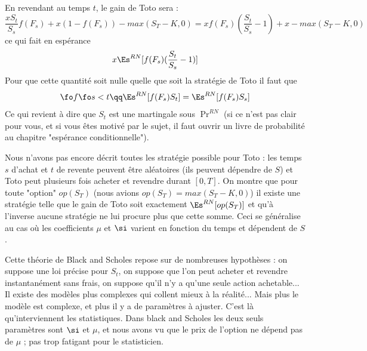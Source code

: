 \documentclass{article}
\begin{document}
 En  revendant au temps $t$, le gain de Toto sera :
$$
\frac {xS_{t}} {S_{s}}f(F_s)  + x (1 - f(F_s))      - max(S_T -K,0) = xf(F_s) (\frac {S_t}{S_s}-1) + x  - max(S_T -K,0)
$$
ce qui fait en espérance 
$$
x \Es^{RN}[f(F_s) (\frac {S_t}{S_s}-1)]  
$$
Pour que cette quantité soit nulle quelle que soit la stratégie de Toto il faut que 
$$
\fo f\fo s< t \qq   \Es^{RN}[f(F_s)  S_t  ] = \Es^{RN}[f(F_s)  S_s  ]  
$$
Ce qui revient à dire que $S_t$ est une martingale sous $\Pr^{RN}$ (si ce n'est pas clair pour vous, et si vous êtes motivé par le sujet, il faut ouvrir un livre de probabilité au chapitre "espérance conditionnelle").   


Nous n'avons pas encore décrit toutes les stratégie possible pour Toto : les temps $s$ d'achat et $t$ de revente peuvent être aléatoires (ils peuvent dépendre de $S$) et Toto peut plusieurs fois acheter et revendre durant $[0,T]$. On montre que pour toute "option" $op(S_T)$ (nous avions $op(S_T) = max(S_T-K,0)$)  il existe une stratégie telle que le gain de Toto soit exactement $\Es^{RN}[op(S_T)]$ et qu'à l'inverse aucune stratégie ne lui procure plus que cette somme.     Ceci se généralise au cas où les coefficients $\mu$ et $\si$ varient en fonction du temps et  dépendent  de $S$.   

Cette théorie de Black and Scholes repose sur de nombreuses hypothèses : on suppose une loi précise pour $S_t$, on suppose que l'on peut acheter et revendre instantanément sans frais, on suppose qu'il n'y a qu'une seule action achetable...  Il existe des modèles plus complexes  qui collent mieux à la réalité... Mais plus le modèle est complexe, et plus il y a de paramètres à ajuster. C'est là qu'interviennent les statistiques.  Dans black and Scholes les deux seuls paramètres sont $\si$ et $\mu$, et nous avons vu que le prix de l'option ne dépend pas de $\mu$ ; pas trop fatigant pour le statisticien. 
\end{document}
